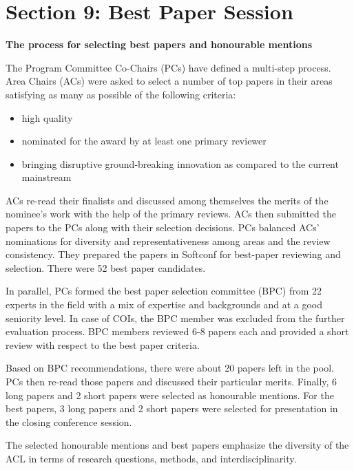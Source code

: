 \section[Section 9]{Section 9: Best Paper Session}

\begin{center}
  {\Large \bf The process for selecting best papers and honourable mentions}
\end{center}

\vspace*{0.5cm}

The Program Committee Co-Chairs (PCs) have defined a multi-step process. Area Chairs (ACs) were asked to select a number of top papers in their areas satisfying as many as possible of the following criteria:
\begin{itemize}
\item high quality
\item nominated for the award by at least one primary reviewer
\item bringing disruptive ground-breaking innovation as compared to the current mainstream
\end{itemize}

ACs re-read their finalists and discussed among themselves the merits of the nominee's work with the help of the primary reviews. ACs then submitted the papers to the PCs along with their selection decisions. PCs balanced ACs' nominations for diversity and representativeness among areas and the review consistency. They  prepared the papers in Softconf for best-paper reviewing and selection. There were 52 best paper candidates.

In parallel, PCs formed the best paper selection committee (BPC) from 22 experts in the field with a mix of expertise and backgrounds and at a good seniority level. In case of COIs, the BPC member was excluded from the further evaluation process. BPC members reviewed 6-8 papers each and provided a short review with respect to the best paper criteria.

Based on BPC recommendations, there were about 20 papers left in the pool. PCs then re-read those papers and discussed their particular merits. Finally, 6 long papers and 2 short papers were selected as honourable mentions. For the best papers, 3 long papers and 2 short papers were selected for presentation in the closing conference session.

The selected honourable mentions and best papers emphasize the diversity of the ACL in terms of research questions, methods, and interdisciplinarity.

